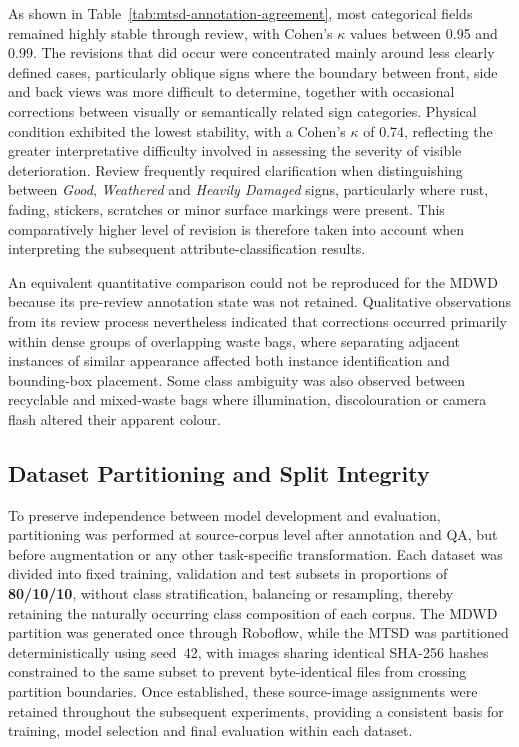 \noindent As shown in Table~\ref{tab:mtsd-annotation-agreement}, most categorical fields remained highly stable through review, with Cohen's \(\kappa\) values between 0.95 and 0.99. The revisions that did occur were concentrated mainly around less clearly defined cases, particularly oblique signs where the boundary between front, side and back views was more difficult to determine, together with occasional corrections between visually or semantically related sign categories. Physical condition exhibited the lowest stability, with a Cohen's \(\kappa\) of 0.74, reflecting the greater interpretative difficulty involved in assessing the severity of visible deterioration. Review frequently required clarification when distinguishing between \emph{Good}, \emph{Weathered} and \emph{Heavily Damaged} signs, particularly where rust, fading, stickers, scratches or minor surface markings were present. This comparatively higher level of revision is therefore taken into account when interpreting the subsequent attribute-classification results.

An equivalent quantitative comparison could not be reproduced for the \gls{MDWD} because its pre-review annotation state was not retained. Qualitative observations from its review process nevertheless indicated that corrections occurred primarily within dense groups of overlapping waste bags, where separating adjacent instances of similar appearance affected both instance identification and bounding-box placement. Some class ambiguity was also observed between recyclable and mixed-waste bags where illumination, discolouration or camera flash altered their apparent colour.

\subsection{Dataset Partitioning and Split Integrity}
\label{sec:md-partitioning}
To preserve independence between model development and evaluation, partitioning was performed at source-corpus level after annotation and \gls{QA}, but before augmentation or any other task-specific transformation. Each dataset was divided into fixed training, validation and test subsets in proportions of \textbf{80/10/10}, without class stratification, balancing or resampling, thereby retaining the naturally occurring class composition of each corpus. The \gls{MDWD} partition was generated once through Roboflow, while the \gls{MTSD} was partitioned deterministically using seed~42, with images sharing identical SHA-256 hashes constrained to the same subset to prevent byte-identical files from crossing partition boundaries. Once established, these source-image assignments were retained throughout the subsequent experiments, providing a consistent basis for training, model selection and final evaluation within each dataset.

